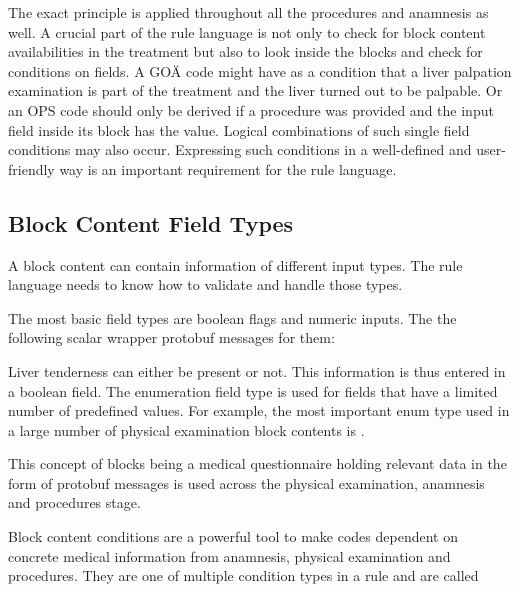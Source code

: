 

The exact principle is applied throughout all the procedures and anamnesis as well.
A crucial part of the rule language is not only to check for block content availabilities in the treatment
but also to look inside the blocks and check for conditions on fields.
A GOÄ code might have as a condition that a liver palpation examination is part of the treatment and
the liver turned out to be palpable.
Or an OPS code should only be derived if a procedure was provided and the
input field inside its block has the value.
Logical combinations of such single field conditions may also occur.
Expressing such conditions in a well-defined and user-friendly way is an important requirement for the rule language.

\subsection{Block Content Field Types}
A block content can contain information of different input types.
The rule language needs to know how to validate and handle those types.

The most basic field types are boolean flags and numeric inputs.
The \AVuses the following scalar wrapper protobuf messages for them:



Liver tenderness can either be present or not.
This information is thus entered in a boolean field.
The enumeration field type is used for fields that have a limited number of predefined values.
For example,
the most important enum type
used in a large number of physical examination block contents is .





This concept of blocks being a medical questionnaire
holding relevant data in the form of protobuf messages is used across the physical examination,
anamnesis and procedures stage.


Block content conditions are a powerful tool to make codes dependent on concrete medical information from anamnesis,
physical examination and procedures.
They are one of multiple condition types in a rule and are called 


